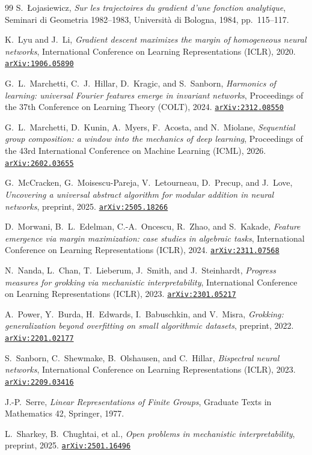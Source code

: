 \documentclass[11pt]{amsart}
\newcommand{\arxiv}[1]{\href{https://arxiv.org/abs/#1}{\texttt{arXiv:#1}}}
\theoremstyle{plain}
\theoremstyle{definition}
\begin{document}
\begin{thebibliography}{99}
S.~{\L}ojasiewicz,
\emph{Sur les trajectoires du gradient d'une fonction analytique},
Seminari di Geometria 1982--1983, Universit\`a di Bologna, 1984, pp.~115--117.

K.~Lyu and J.~Li,
\emph{Gradient descent maximizes the margin of homogeneous neural networks},
International Conference on Learning Representations (ICLR), 2020.
\arxiv{1906.05890}

G.~L.~Marchetti, C.~J.~Hillar, D.~Kragic, and S.~Sanborn,
\emph{Harmonics of learning: universal Fourier features emerge in invariant networks},
Proceedings of the 37th Conference on Learning Theory (COLT), 2024.
\arxiv{2312.08550}

G.~L.~Marchetti, D.~Kunin, A.~Myers, F.~Acosta, and N.~Miolane,
\emph{Sequential group composition: a window into the mechanics of deep learning},
Proceedings of the 43rd International Conference on Machine Learning (ICML), 2026.
\arxiv{2602.03655}

G.~McCracken, G.~Moisescu-Pareja, V.~Letourneau, D.~Precup, and J.~Love,
\emph{Uncovering a universal abstract algorithm for modular addition in neural networks},
preprint, 2025.
\arxiv{2505.18266}

D.~Morwani, B.~L.~Edelman, C.-A.~Oncescu, R.~Zhao, and S.~Kakade,
\emph{Feature emergence via margin maximization: case studies in algebraic tasks},
International Conference on Learning Representations (ICLR), 2024.
\arxiv{2311.07568}

N.~Nanda, L.~Chan, T.~Lieberum, J.~Smith, and J.~Steinhardt,
\emph{Progress measures for grokking via mechanistic interpretability},
International Conference on Learning Representations (ICLR), 2023.
\arxiv{2301.05217}

A.~Power, Y.~Burda, H.~Edwards, I.~Babuschkin, and V.~Misra,
\emph{Grokking: generalization beyond overfitting on small algorithmic datasets},
preprint, 2022.
\arxiv{2201.02177}

S.~Sanborn, C.~Shewmake, B.~Olshausen, and C.~Hillar,
\emph{Bispectral neural networks},
International Conference on Learning Representations (ICLR), 2023.
\arxiv{2209.03416}

J.-P.~Serre,
\emph{Linear Representations of Finite Groups},
Graduate Texts in Mathematics 42, Springer, 1977.

L.~Sharkey, B.~Chughtai, et al.,
\emph{Open problems in mechanistic interpretability},
preprint, 2025.
\arxiv{2501.16496}


\end{thebibliography}
\end{document}
